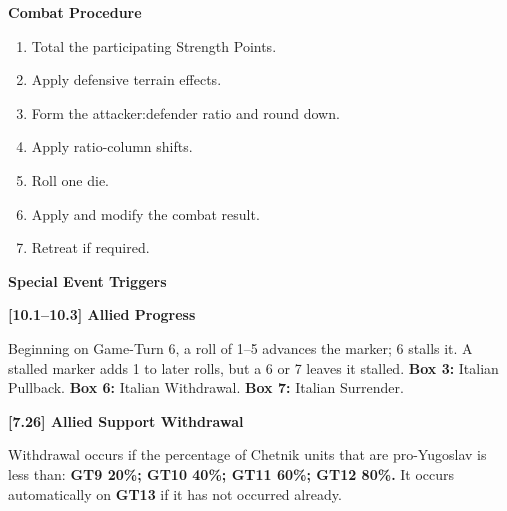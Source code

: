 \documentclass[10pt,letterpaper]{article}
\newcommand{\aidheading}[1]{%
  \par\vspace{4pt}%
  {\sffamily\bfseries\large\color{TitoInk}#1\par}%
  \vspace{1.5pt}{\color{TitoRule}\hrule height 0.5pt}\vspace{4pt}%
}
\begin{document}
\vfill
\noindent
\begin{minipage}[t]{0.49\textwidth}
  \vspace{0pt}
  \aidheading{Combat Procedure}
  \footnotesize
  \begin{enumerate}[
    leftmargin=1.4em,
    label=\arabic*.,
    itemsep=1pt,
    topsep=1pt
  ]
    \item Total the participating Strength Points.
    \item Apply defensive terrain effects.
    \item Form the attacker:defender ratio and round down.
    \item Apply ratio-column shifts.
    \item Roll one die.
    \item Apply and modify the combat result.
    \item Retreat if required.
  \end{enumerate}
\end{minipage}
\hfill
\begin{minipage}[t]{0.49\textwidth}
  \vspace{0pt}
  \aidheading{Special Event Triggers}
  \footnotesize
  {\sffamily\bfseries\color{TitoInk}[10.1--10.3] Allied Progress\par}
  Beginning on Game-Turn 6, a roll of 1--5 advances the marker; 6 stalls it.
  A stalled marker adds 1 to later rolls, but a 6 or 7 leaves it stalled.
  \textbf{Box 3:} Italian Pullback. \textbf{Box 6:} Italian Withdrawal.
  \textbf{Box 7:} Italian Surrender.

  \vspace{4pt}
  {\sffamily\bfseries\color{TitoInk}[7.26] Allied Support Withdrawal\par}
  Withdrawal occurs if the percentage of Chetnik units that are pro-Yugoslav
  is less than: \textbf{GT9 20\%; GT10 40\%; GT11 60\%; GT12 80\%.}
  It occurs automatically on \textbf{GT13} if it has not occurred already.
\end{minipage}
\end{document}

